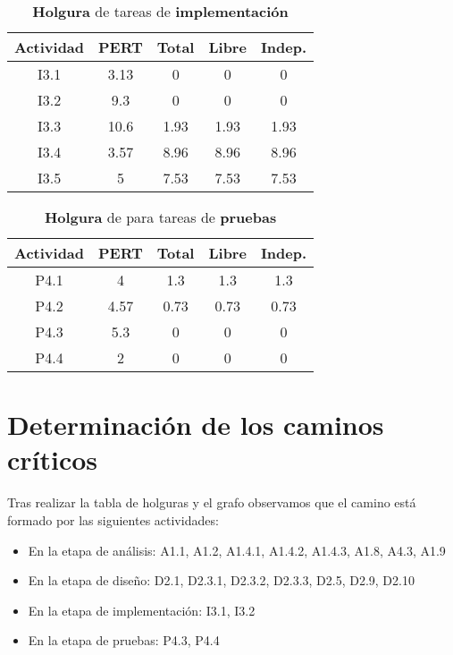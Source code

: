 \documentclass[11pt,a4paper,spanish,twoside]{report}
\begin{document}
\begin{table}[!h]
\centering
  \begin{tabular}{|c||c||c|c|c|}
    \hline
     \textbf{Actividad} & \textbf{PERT} & \textbf{Total} & \textbf{Libre}
    & \textbf{Indep.}\\
    \hline \hline
    I3.1 & 3.13 & 0 & 0 & 0\\
    \hline
    I3.2 & 9.3 & 0 & 0 & 0\\
    \hline
    I3.3 & 10.6 & 1.93 & 1.93 & 1.93\\
    \hline
    I3.4 & 3.57 & 8.96 & 8.96 & 8.96\\
    \hline
    I3.5 & 5 & 7.53 & 7.53 & 7.53\\
    \hline
  \end{tabular}
  \caption{\textbf{Holgura} de tareas de \textbf{implementación}}
  \label{Tab:hol3}
\end{table}

\begin{table}[!h]
\centering
  \begin{tabular}{|c||c||c|c|c|}
    \hline
     \textbf{Actividad} & \textbf{PERT} & \textbf{Total} & \textbf{Libre}
    & \textbf{Indep.}\\
    \hline \hline
    P4.1 & 4 & 1.3 & 1.3 & 1.3\\
    \hline
    P4.2 & 4.57 & 0.73 & 0.73 & 0.73\\
    \hline
    P4.3 & 5.3 & 0 & 0 & 0\\
    \hline
    P4.4 & 2 & 0 & 0 & 0\\
    \hline
  \end{tabular}
  \caption{\textbf{Holgura} de para tareas de \textbf{pruebas}}
  \label{Tab:hol4}
\end{table}

\section{Determinación de los caminos críticos}

Tras realizar la tabla de holguras y el grafo observamos que el camino está formado por las siguientes actividades:
\begin{itemize}
\item En la etapa de análisis: A1.1, A1.2, A1.4.1, A1.4.2, A1.4.3, A1.8, A4.3, A1.9

\item En la etapa de diseño: D2.1, D2.3.1, D2.3.2, D2.3.3, D2.5, D2.9, D2.10 

\item En la etapa de implementación: I3.1, I3.2

\item En la etapa de pruebas: P4.3, P4.4

\end{itemize}
\end{document}
